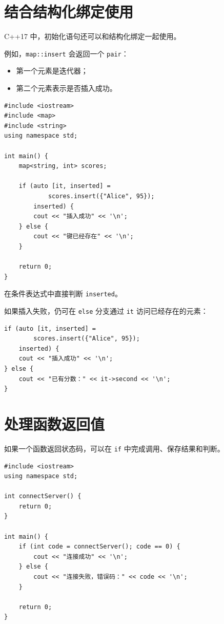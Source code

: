 \documentclass[UTF8,12pt,a4paper]{ctexart}
\begin{document}
\section{结合结构化绑定使用}

C++17 中，初始化语句还可以和结构化绑定一起使用。

例如，\texttt{map::insert} 会返回一个 \texttt{pair}：

\begin{itemize}
    \item 第一个元素是迭代器；
    \item 第二个元素表示是否插入成功。
\end{itemize}

\begin{lstlisting}
#include <iostream>
#include <map>
#include <string>
using namespace std;

int main() {
    map<string, int> scores;

    if (auto [it, inserted] =
            scores.insert({"Alice", 95});
        inserted) {
        cout << "插入成功" << '\n';
    } else {
        cout << "键已经存在" << '\n';
    }

    return 0;
}
\end{lstlisting}

在条件表达式中直接判断 \texttt{inserted}。

如果插入失败，仍可在 \texttt{else} 分支通过 \texttt{it} 访问已经存在的元素：

\begin{lstlisting}
if (auto [it, inserted] =
        scores.insert({"Alice", 95});
    inserted) {
    cout << "插入成功" << '\n';
} else {
    cout << "已有分数：" << it->second << '\n';
}
\end{lstlisting}

\section{处理函数返回值}

如果一个函数返回状态码，可以在 \texttt{if} 中完成调用、保存结果和判断。

\begin{lstlisting}
#include <iostream>
using namespace std;

int connectServer() {
    return 0;
}

int main() {
    if (int code = connectServer(); code == 0) {
        cout << "连接成功" << '\n';
    } else {
        cout << "连接失败，错误码：" << code << '\n';
    }

    return 0;
}
\end{lstlisting}
\end{document}
